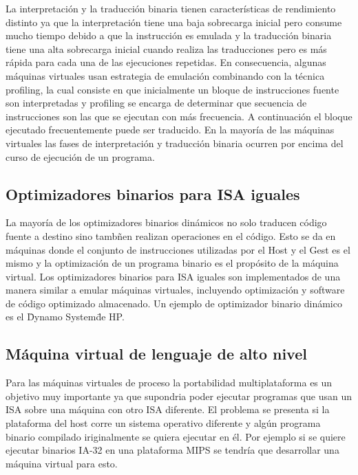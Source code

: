 \documentclass[10pt,a4paper,spanish]{report}
\begin{document}
  \noindent
  La interpretación y la traducción binaria tienen características de rendimiento distinto ya que la interpretación tiene una baja sobrecarga inicial pero consume mucho tiempo debido a que la instrucción es emulada y la traducción binaria tiene una alta sobrecarga inicial cuando realiza las traducciones pero es más rápida para cada una de las ejecuciones repetidas.
  En consecuencia, algunas máquinas virtuales usan estrategia de emulación combinando con la técnica profiling, la cual consiste en que inicialmente un bloque de instrucciones fuente son interpretadas y profiling se encarga de determinar que secuencia de instrucciones son las que se ejecutan con más frecuencia. A continuación el bloque ejecutado frecuentemente puede ser traducido. En la mayoría de las máquinas virtuales las fases de interpretación y traducción binaria ocurren por encima del curso de ejecución de un programa.

  \subsection{Optimizadores binarios para ISA iguales}

  \noindent
  La mayoría de los optimizadores binarios dinámicos no solo traducen código fuente a destino sino tambñen realizan operaciones en el código. Esto se da en máquinas donde el conjunto de instrucciones utilizadas por el Host y el Gest es el mismo y la optimización de un programa binario es el propósito de la máquina virtual. Los optimizadores binarios para ISA iguales son implementados de una manera similar a emular máquinas virtuales, incluyendo optimización y software de código optimizado almacenado. Un ejemplo de optimizador binario dinámico es el \"Dynamo System\" de HP.

  \subsection{Máquina virtual de lenguaje de alto nivel}

  \noindent
  Para las máquinas virtuales de proceso la portabilidad multiplataforma es un objetivo muy importante ya que supondria poder ejecutar programas que usan un ISA sobre una máquina con otro ISA diferente. El problema se presenta si la plataforma del host corre un sistema operativo diferente y algún programa binario compilado iriginalmente se quiera ejecutar en él. Por ejemplo si se quiere ejecutar binarios IA-32 en una plataforma MIPS se tendría que desarrollar una máquina virtual para esto. \\
\end{document}
